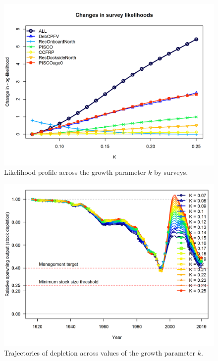 \documentclass[12pt,]{article}
\begin{document}
\FloatBarrier 

\begin{figure}
\centering
\includegraphics{Figures/profile_k_piner2.png}
\caption{Likelihood profile across the growth parameter \(k\) by
surveys. \label{fig:profile_k_piner2}}
\end{figure}

\FloatBarrier

\begin{figure}
\centering
\includegraphics{Figures/profile_k_depl.png}
\caption{Trajectories of depletion across values of the growth parameter
\(k\). \label{fig:profile_k_depl}}
\end{figure}
\end{document}
